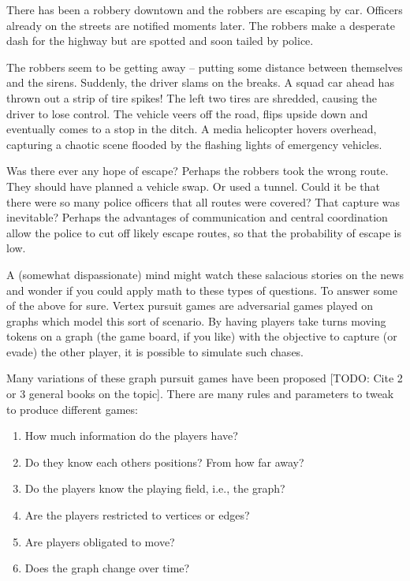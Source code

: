 There has been a robbery downtown and the robbers are escaping by car. Officers
already on the streets are notified moments later. The robbers make a desperate dash for the highway but are spotted and soon tailed by police.

The robbers seem to be getting away -- putting some distance between themselves and the sirens.
Suddenly, the driver slams on the breaks. A squad car ahead has thrown out a strip of tire spikes! The left two tires are shredded, causing the driver to lose control. The vehicle veers off the road, flips upside down and eventually comes to a stop in the ditch. A media helicopter hovers overhead, capturing
a chaotic scene flooded by the flashing lights of emergency vehicles.

Was there ever any hope of escape? Perhaps the robbers took the wrong route.
They should have planned a vehicle swap. Or used a tunnel. Could it be that there were
so many police officers that all routes were covered? That capture was inevitable?
Perhaps the advantages of communication and central coordination allow the police to
  cut off likely escape routes, so that the probability of escape is low.

A (somewhat dispassionate) mind might watch these salacious stories on the news and wonder
 if you could apply math to these types of questions. To answer some of the above for sure.
Vertex pursuit games are adversarial games played on graphs which model this sort
of scenario.
By having players take turns moving tokens on a graph (the game board, if you like) with
the objective to capture (or evade) the other player, it is possible to simulate such chases.

Many variations of these graph pursuit games have been proposed [TODO: Cite 2 or 3 general books on the topic]. There are many rules and
parameters to tweak to produce different games:

\begin{enumerate}
\item How much information do the players have?
\item Do they know each others positions? From how far away?
\item Do the players know the playing field, i.e., the graph?
\item Are the players restricted to vertices or edges?
\item Are players obligated to move?
\item Does the graph change over time?
\end{enumerate}

